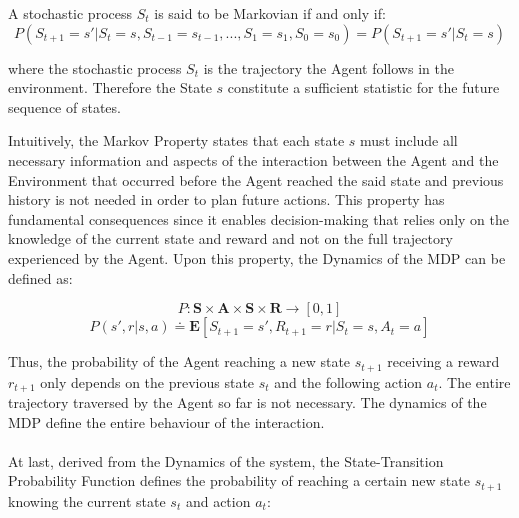             \begin{definition}
                \label{def:markov}
                A stochastic process $S_{t}$ is said to be Markovian if and only if:
                \[ P \left( S_{t+1} = s' | S_{t} = s, S_{t-1} = s_{t-1}, ..., S_{1} = s_1, S_{0} = s_0 \right) = P \left( S_{t+1} = s' | S_{t} = s \right)\]
                
                where the stochastic process $S_t$ is the trajectory the Agent follows in the environment. Therefore the State $s$ constitute a sufficient statistic for the future sequence of states.
            \end{definition}
            \noindent
            Intuitively, the Markov Property states that each state $s$ must include all necessary information and aspects of the interaction between the Agent and the Environment that occurred before the Agent reached the said state and previous history is not needed in order to plan future actions. \newline
            This property has fundamental consequences since it enables decision-making that relies only on the knowledge of the current state and reward and not on the full trajectory experienced by the Agent. Upon this property, the Dynamics of the MDP can be defined as: 
            
            \begin{definition}
                \label{def:dynamics}
                \[P : \mathbf{S} \times \mathbf{A} \times \mathbf{S} \times \mathbf{R} \rightarrow [0, 1] \]
                \[P(s', r | s, a) \doteq \mathbf{E} \left[S_{t+1}=s', R_{t+1}=r | S_t=s, A_t=a \right]\]
            \end{definition}
            
            Thus, the probability of the Agent reaching a new state $s_{t+1}$ receiving a reward $r_{t+1}$ only depends on the previous state $s_t$ and the following action $a_t$. The entire trajectory traversed by the Agent so far is not necessary. The dynamics of the MDP define the entire behaviour of the interaction.
            \\\\
            At last, derived from the Dynamics of the system, the State-Transition Probability Function defines the probability of reaching a certain new state $s_{t+1}$ knowing the current state $s_t$ and action $a_t$:
            
